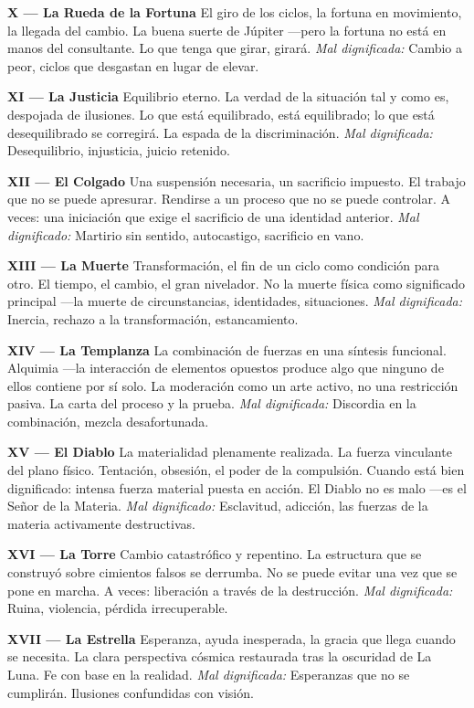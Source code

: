 \textbf{X --- La Rueda de la Fortuna} El giro de los ciclos, la fortuna en movimiento, la llegada del cambio. La buena suerte de Júpiter ---pero la fortuna no está en manos del consultante. Lo que tenga que girar, girará. \emph{Mal dignificada:} Cambio a peor, ciclos que desgastan en lugar de elevar.

\textbf{XI --- La Justicia} Equilibrio eterno. La verdad de la situación tal y como es, despojada de ilusiones. Lo que está equilibrado, está equilibrado; lo que está desequilibrado se corregirá. La espada de la discriminación. \emph{Mal dignificada:} Desequilibrio, injusticia, juicio retenido.

\textbf{XII --- El Colgado} Una suspensión necesaria, un sacrificio impuesto. El trabajo que no se puede apresurar. Rendirse a un proceso que no se puede controlar. A veces: una iniciación que exige el sacrificio de una identidad anterior. \emph{Mal dignificado:} Martirio sin sentido, autocastigo, sacrificio en vano.

\textbf{XIII --- La Muerte} Transformación, el fin de un ciclo como condición para otro. El tiempo, el cambio, el gran nivelador. No la muerte física como significado principal ---la muerte de circunstancias, identidades, situaciones. \emph{Mal dignificada:} Inercia, rechazo a la transformación, estancamiento.

\textbf{XIV --- La Templanza} La combinación de fuerzas en una síntesis funcional. Alquimia ---la interacción de elementos opuestos produce algo que ninguno de ellos contiene por sí solo. La moderación como un arte activo, no una restricción pasiva. La carta del proceso y la prueba. \emph{Mal dignificada:} Discordia en la combinación, mezcla desafortunada.

\textbf{XV --- El Diablo} La materialidad plenamente realizada. La fuerza vinculante del plano físico. Tentación, obsesión, el poder de la compulsión. Cuando está bien dignificado: intensa fuerza material puesta en acción. El Diablo no es malo ---es el Señor de la Materia. \emph{Mal dignificado:} Esclavitud, adicción, las fuerzas de la materia activamente destructivas.

\textbf{XVI --- La Torre} Cambio catastrófico y repentino. La estructura que se construyó sobre cimientos falsos se derrumba. No se puede evitar una vez que se pone en marcha. A veces: liberación a través de la destrucción. \emph{Mal dignificada:} Ruina, violencia, pérdida irrecuperable.

\textbf{XVII --- La Estrella} Esperanza, ayuda inesperada, la gracia que llega cuando se necesita. La clara perspectiva cósmica restaurada tras la oscuridad de La Luna. Fe con base en la realidad. \emph{Mal dignificada:} Esperanzas que no se cumplirán. Ilusiones confundidas con visión.

